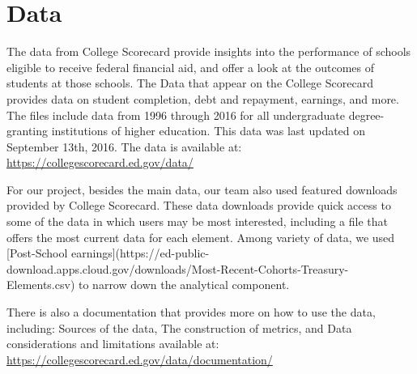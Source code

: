 \section{Data}

The data from College Scorecard provide insights into the performance of schools eligible to receive federal financial aid, and offer a look at the outcomes of students at those schools. The Data that appear on the College Scorecard provides data on student completion, debt and repayment, earnings, and more. The files include data from 1996 through 2016 for all undergraduate degree-granting institutions of higher education. This data was last updated on September 13th, 2016. The data is available at: \url{https://collegescorecard.ed.gov/data/}

For our project, besides the main data, our team also used featured downloads provided by College Scorecard. These data downloads provide quick access to some of the data in which users may be most interested, including a file that offers the most current data for each element. Among variety of data, we used [Post-School earnings](https://ed-public-download.apps.cloud.gov/downloads/Most-Recent-Cohorts-Treasury-Elements.csv) to narrow down the analytical component.

There is also a documentation that provides more on how to use the data, including: Sources of the data, The construction of metrics, and Data considerations and limitations available at: \url{https://collegescorecard.ed.gov/data/documentation/}
